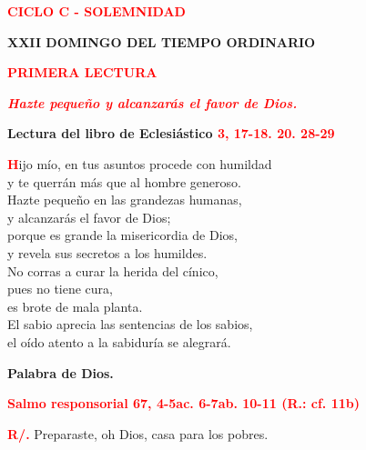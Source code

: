\documentclass[12pt, letterpaper]{article}
\begin{document}
    \begin{center}
    \Large {\bfseries \textcolor{red}{CICLO C - SOLEMNIDAD}}
    \end{center}

    \begin{center}
    \Huge {\bfseries XXII DOMINGO DEL TIEMPO ORDINARIO}
    \end{center}

    \begin{center}
    \Large {\bfseries \textcolor{red}{PRIMERA LECTURA}}
    \end{center}

    \begin{center}
    \large {\bfseries \textit{ \textcolor{red}{Hazte pequeño y alcanzarás el favor de Dios.}}}
    \end{center}

    \Large {\bfseries Lectura del libro de Eclesiástico \hspace{1cm} \textcolor{red}{3, 17-18. 20. 28-29}}

    \lettrine[lines=2]{\bfseries \textcolor{red}{H}}{}\Large ijo mío, en tus asuntos procede con humildad\\
    y te querrán más que al hombre generoso.\\
    Hazte pequeño en las grandezas humanas,\\
    y alcanzarás el favor de Dios;\\
    porque es grande la misericordia de Dios,\\
    y revela sus secretos a los humildes.\\
    No corras a curar la herida del cínico,\\
    pues no tiene cura,\\
    es brote de mala planta.\\
    El sabio aprecia las sentencias de los sabios,\\
    el oído atento a la sabiduría se alegrará.

    {\bfseries Palabra de Dios.}

    \newpage

    \Large {\bfseries \textcolor{red}{Salmo responsorial \hspace{1cm} 67, 4-5ac. 6-7ab. 10-11 (R.: cf. 11b)}}

    \Large {\bfseries \textcolor{red}{R/.}} \hspace{1cm} Preparaste, oh Dios, casa para los pobres.
\end{document}

